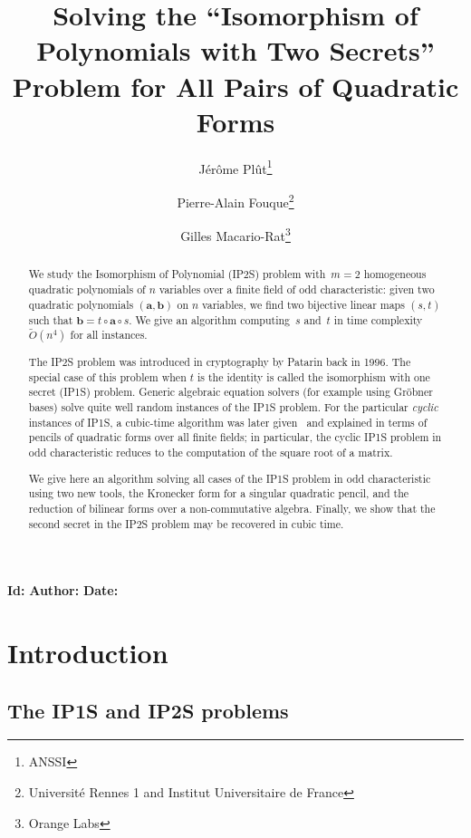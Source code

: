 \documentclass{article}%
\def\Ot{\widetilde{O}}
\def\gitkw$#1:#2${{\small \textbf{#1:}\texttt{#2}}}
\begin{document}
\title%
{Solving the ``Isomorphism of Polynomials with Two Secrets'' Problem
for All Pairs of Quadratic Forms}%
\author{Jérôme Plût\footnote{ANSSI}
\and Pierre-Alain Fouque\footnote{Université Rennes 1 and Institut
Universitaire de France}
\and Gilles Macario-Rat\footnote{Orange Labs}}
\maketitle

\centerline{\gitkw $Id:$
\gitkw $Author:$
\gitkw $Date:$}

\begin{abstract}%
We study the Isomorphism of Polynomial (IP2S) problem
with~$m=2$ homogeneous quadratic polynomials of $n$ variables over a finite field of odd
characteristic: given two quadratic polynomials $(\bm{a},\bm{b})$ 
on $n$ variables, we find two bijective linear maps $(s,t)$ such that
$\bm{b}=t\circ \bm{a}\circ s$. We give an algorithm computing~$s$ and~$t$
in time complexity~$\Ot(n^4)$ for all instances.

The IP2S problem was introduced in cryptography by Patarin back in 1996.
The special case of this problem when $t$ is the identity is called
the isomorphism with one secret (IP1S) problem.
Generic algebraic equation solvers (for example using Gröbner bases)
solve quite well random instances of the IP1S problem. For the particular
\emph{cyclic} instances of IP1S, a cubic-time algorithm was later
given~\cite{MPG2013} and explained in terms of pencils of quadratic forms
over all finite fields; in particular, the cyclic IP1S problem in odd
characteristic reduces to the computation of the square root of a matrix.

We give here an algorithm solving all cases of the IP1S problem in odd
characteristic using two new tools, the Kronecker form for a singular
quadratic pencil, and the reduction of bilinear forms over a non-commutative
algebra. Finally, we show that the second secret in the IP2S problem may
be recovered in cubic time.
\end{abstract}%
\section*{Introduction}%
\subsection*{The IP1S and IP2S problems}%
\end{document}
